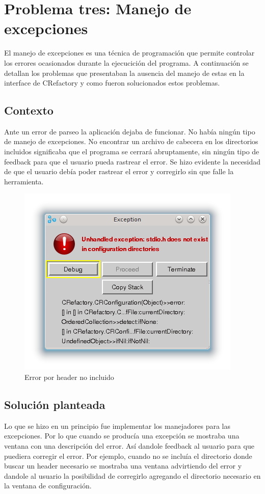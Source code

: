 \documentclass[a4paper,oneside,10pt]{article}
\begin{document}
\section{Problema tres: Manejo de excepciones}

El manejo de excepciones es una t\'ecnica de programaci\'on que permite controlar los errores ocasionados durante la ejecucici\'on del programa.
A continuaci\'on se detallan los problemas que presentaban la ausencia del manejo de estas en la interface de CRefactory y como fueron solucionados estos problemas.

\subsection{Contexto}
Ante un error de parseo la aplicación dejaba de funcionar. No había ningún tipo de manejo de excepciones. No encontrar un archivo de cabecera en los directorios incluidos significaba que el programa se cerrar\'a abruptamente, sin ningún tipo de feedback para que el usuario pueda rastrear el error. Se hizo evidente la necesidad de que el usuario debía poder rastrear el error y corregirlo sin que falle la herramienta.

\begin{figure}[h!]
  \centering
    \includegraphics[scale=0.85]{images/codigo_original/error_header_no_agregado.png}
     \caption{Error por header no incluido}
\end{figure}

\subsection{Soluci\'on planteada}
Lo que se hizo en un principio fue implementar los manejadores para las excepciones. Por lo que cuando se produc\'ia una excepci\'on se mostraba una ventana con una descripci\'on del error. As\'i dandole feedback al usuario para que puediera corregir el error. Por ejemplo, cuando no se inclu\'ia el directorio donde buscar un header necesario se mostraba una ventana advirtiendo del error y dandole al usuario la posibilidad de corregirlo agregando el directorio necesario en la ventana de configuraci\'on.
\end{document}

